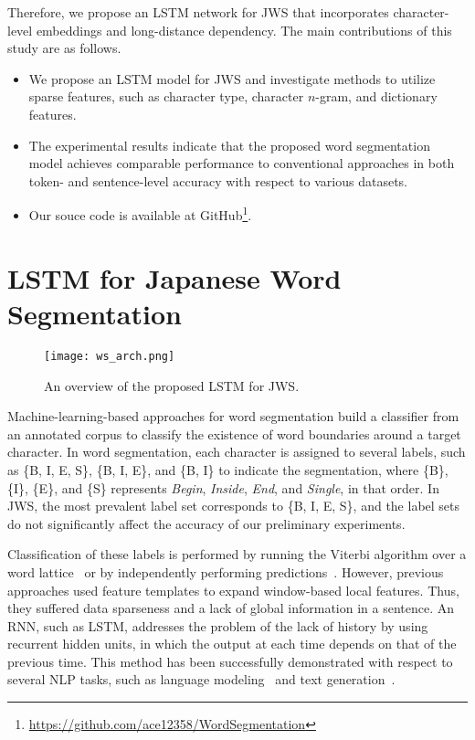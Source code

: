 \documentclass[11pt]{article}
\begin{document}
Therefore, we propose an LSTM network for JWS that incorporates
character-level embeddings and long-distance dependency.
The main contributions of this study are as follows.

\begin{itemize}

\item We propose an LSTM model for JWS and investigate methods to utilize
    sparse features, such as character type, character $n$-gram, and dictionary
    features.

\item The experimental results indicate that the proposed word segmentation
    model achieves comparable performance to conventional approaches in both
    token- and sentence-level accuracy with respect to various datasets.

\item Our souce code is available at GitHub\footnote{\url{https://github.com/ace12358/WordSegmentation}}.

\end{itemize}

\section{LSTM for Japanese Word Segmentation}

\begin{figure*}[t]
\centering
\texttt{[image: ws\_arch.png]}              
\caption{An overview of the proposed LSTM for JWS.}    
\label{ws_arch}    
\end{figure*}

Machine-learning-based approaches for word segmentation build a classifier
from an annotated corpus to classify the existence of word boundaries around a
target character.
In word segmentation, each character is assigned to several labels, such as
\{B, I, E, S\}, \{B, I, E\}, and \{B, I\} to indicate the segmentation, where
\{B\}, \{I\}, \{E\}, and \{S\} represents {\it Begin}, {\it Inside}, {\it
End}, and {\it Single}, in that order. 
In JWS, the most prevalent label set corresponds to \{B, I, E, S\},
and the label sets do not significantly affect the accuracy of our preliminary
experiments.

Classification of these labels is performed by running the Viterbi algorithm
over a word
lattice~\cite{kudo-yamamoto-matsumoto:2004:EMNLP,nakagawa2004chinese,kaji-kitsuregawa:2013:IJCNLP}
or by independently performing
predictions~\cite{neubig-nakata-mori:2011:ACL-HLT2011}. However, previous
approaches used feature templates to expand window-based local features.
Thus, they suffered data sparseness and a lack of global information in a
sentence.
An RNN, such as LSTM, addresses the problem of the lack of history by using
recurrent hidden units, in which the output at each time depends on that of the previous time. 
This method has been successfully demonstrated with respect to several NLP
tasks, such as language modeling~\cite{mikolov2010recurrent} and text
generation~\cite{sutskever2011generating}.
\end{document}
